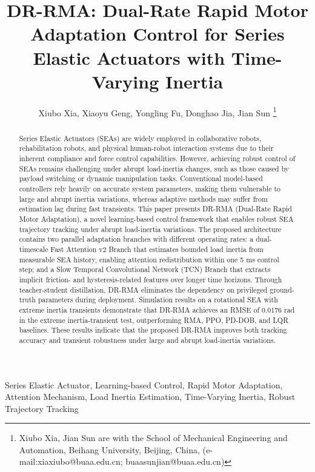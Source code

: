\documentclass[lettersize,journal]{IEEEtran}
\begin{document}
 

\title{DR-RMA: Dual-Rate Rapid Motor Adaptation Control for Series Elastic Actuators with Time-Varying Inertia} 

\author{Xiubo Xia, Xiaoyu Geng, Yongling Fu, Donghao Jia, Jian Sun
    \thanks{Xiubo Xia, Jian Sun are with the School of Mechanical Engineering and Automation, Beihang University, Beijing, China, (e-mail:xiaxiubo@buaa.edu.cn; buaasunjian@buaa.edu.cn)} 
}

\maketitle 

\begin{abstract}
Series Elastic Actuators (SEAs) are widely employed in collaborative robots, rehabilitation robots, and physical 
human-robot interaction systems due to their inherent compliance and force control capabilities. 
However, achieving robust control of SEAs remains challenging under abrupt load-inertia changes, 
such as those caused by payload switching or dynamic manipulation tasks.
Conventional model-based controllers rely heavily on accurate system parameters, 
making them vulnerable to large and abrupt inertia variations, 
whereas adaptive methods may suffer from estimation lag during fast transients. 
This paper presents DR-RMA (Dual-Rate Rapid Motor Adaptation), 
a novel learning-based control framework that enables robust SEA trajectory tracking under abrupt load-inertia variations.
The proposed architecture contains two parallel adaptation branches with different operating rates: 
a dual-timescale Fast Attention v2 Branch that estimates bounded load inertia from measurable SEA history, 
enabling attention redistribution within one 5 ms control step; and a Slow Temporal 
Convolutional Network (TCN) Branch that extracts implicit friction- and hysteresis-related features over 
longer time horizons.
Through teacher-student distillation, DR-RMA eliminates the dependency on privileged ground-truth parameters 
during deployment. Simulation results on a rotational SEA with extreme inertia transients demonstrate that 
DR-RMA achieves an RMSE of 0.0176 rad in the extreme inertia-transient test, outperforming RMA, PPO, PD-DOB, and LQR baselines. 
These results indicate that the proposed DR-RMA improves both tracking accuracy 
and transient robustness under large and abrupt load-inertia variations.
\end{abstract}

\begin{IEEEkeywords}
Series Elastic Actuator, Learning-based Control, Rapid Motor Adaptation, Attention Mechanism, 
Load Inertia Estimation, Time-Varying Inertia, Robust Trajectory Tracking
\end{IEEEkeywords}
\end{document}
